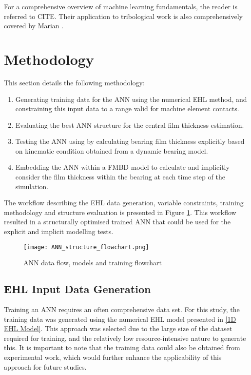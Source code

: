 For a comprehensive overview of machine learning fundamentals, the reader is referred to CITE. Their application to tribological work is also comprehensively covered by Marian \cite{Marian2021}.

\section{Methodology}

This section details the following methodology:

\begin{enumerate}
	\item Generating training data for the ANN using the numerical EHL method, and constraining this input data to a range valid for machine element contacts.
	\item Evaluating the best ANN structure for the central film thickness estimation.
	\item Testing the ANN using by calculating bearing film thickness explicitly based on kinematic condition obtained from a dynamic bearing model.
	\item Embedding the ANN within a FMBD model to calculate and implicitly consider the film thickness within the bearing at each time step of the simulation.
	
\end{enumerate}

The workflow describing the EHL data generation, variable constraints, training methodology and structure evaluation is presented in Figure \ref{ANN flowchart}. This workflow resulted in a structurally optimised trained ANN that could be used for the explicit and implicit modelling tests.

\begin{figure}  
	\centering
	\texttt{[image: ANN\_structure\_flowchart.png]}
	\caption{ANN data flow, models and training flowchart}
	\label{ANN flowchart}
\end{figure} 

\subsection{EHL Input Data Generation}

Training an ANN requires an often comprehensive data set. For this study, the training data was generated using the numerical EHL model presented in \ref{1D EHL Model}. This approach was selected due to the large size of the dataset required for training, and the relatively low resource-intensive nature to generate this. It is important to note that the training data could also be obtained from experimental work, which would further enhance the applicability of this approach for future studies.

